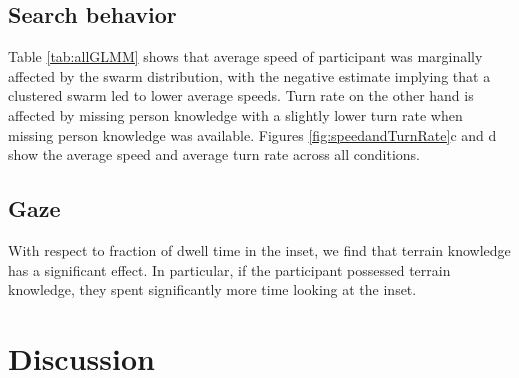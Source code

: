 \documentclass{article}
\begin{document}

\subsection{Search behavior}


Table \ref{tab:allGLMM} shows that average speed of participant was marginally affected by the swarm distribution, with the negative estimate implying that a clustered swarm led to lower average speeds. Turn rate on the other hand is affected by missing person knowledge with a slightly lower turn rate when missing person knowledge was available. Figures \ref{fig:speedandTurnRate}c and d show the average speed and average turn rate across all conditions.

\subsection{Gaze}
With respect to fraction of dwell time in the inset, we find that terrain knowledge has a significant effect. In particular, if the participant possessed terrain knowledge, they spent significantly more time looking at the inset.




\section{Discussion} \label{sec:discussion}
\end{document}
